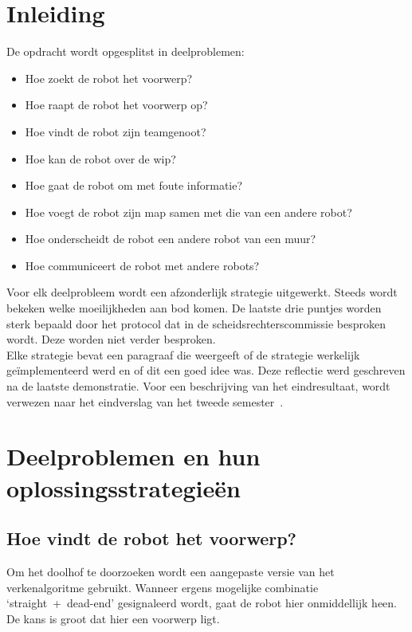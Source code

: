 \documentclass{peno}
\begin{document}
\maketitle

\section{Inleiding}

De opdracht wordt opgesplitst in deelproblemen:

\begin{itemize}
\item Hoe zoekt de robot het voorwerp?
\item Hoe raapt de robot het voorwerp op?
\item Hoe vindt de robot zijn teamgenoot?
\item Hoe kan de robot over de wip?
\item Hoe gaat de robot om met foute informatie?
\item Hoe voegt de robot zijn map samen met die van een andere robot?
\item Hoe onderscheidt de robot een andere robot van een muur?
\item Hoe communiceert de robot met andere robots?
\end{itemize}

Voor elk deelprobleem wordt een afzonderlijk strategie uitgewerkt. Steeds wordt bekeken welke moeilijkheden aan bod komen. De laatste drie puntjes worden sterk bepaald door het protocol dat in de scheidsrechterscommissie besproken wordt. Deze worden niet verder besproken.\\

Elke strategie bevat een paragraaf die weergeeft of de strategie werkelijk ge\"implementeerd werd en of dit een goed idee was. Deze reflectie werd geschreven na de laatste demonstratie. Voor een beschrijving van het eindresultaat, wordt verwezen naar het eindverslag van het tweede semester~\cite{Verslag2}.


\section{Deelproblemen en hun oplossingsstrategie\"en}
\subsection*{Hoe vindt de robot het voorwerp?}

Om het doolhof te doorzoeken wordt een aangepaste versie van het verkenalgoritme gebruikt. Wanneer ergens mogelijke combinatie `straight~+~dead-end' gesignaleerd wordt, gaat de robot hier onmiddellijk heen. De kans is groot dat hier een voorwerp ligt.
\end{document}
